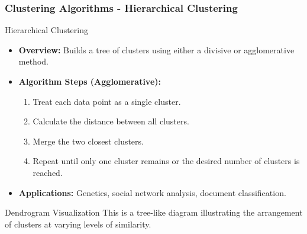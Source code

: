 \documentclass[aspectratio=169]{beamer}
\begin{document}
\begin{frame}[fragile]
    \frametitle{Clustering Algorithms - Hierarchical Clustering}
    \begin{block}{Hierarchical Clustering}
        \begin{itemize}
            \item \textbf{Overview:} Builds a tree of clusters using either a divisive or agglomerative method.
            \item \textbf{Algorithm Steps (Agglomerative):}
            \begin{enumerate}
                \item Treat each data point as a single cluster.
                \item Calculate the distance between all clusters.
                \item Merge the two closest clusters.
                \item Repeat until only one cluster remains or the desired number of clusters is reached.
            \end{enumerate}
            \item \textbf{Applications:} Genetics, social network analysis, document classification.
        \end{itemize}
    \end{block}
    \begin{block}{Dendrogram Visualization}
        This is a tree-like diagram illustrating the arrangement of clusters at varying levels of similarity.
    \end{block}
\end{frame}
\end{document}
